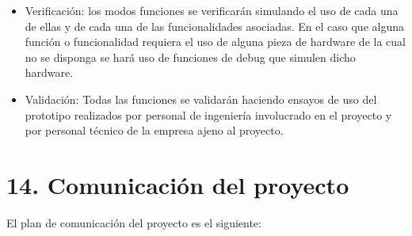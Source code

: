 \documentclass[11pt]{charter}
\begin{document}
\begin{enumerate}
\begin{enumerate}
\begin{itemize}
\item Verificación: los modos funciones se verificarán simulando el uso de cada una de ellas y de cada una de las funcionalidades asociadas. En el caso que alguna función o funcionalidad requiera el uso de alguna pieza de hardware de la cual no se disponga se hará uso de funciones de debug que simulen dicho hardware.
\item Validación: Todas las funciones se validarán haciendo ensayos de uso del prototipo realizados por personal de ingeniería involucrado en el proyecto y por personal técnico de la empresa ajeno al proyecto.
\end{itemize}		
	
	\end{enumerate}				
\end{enumerate}

\section{14. Comunicación del proyecto}
\label{sec:comunicaciones}

El plan de comunicación del proyecto es el siguiente:
\end{document}
